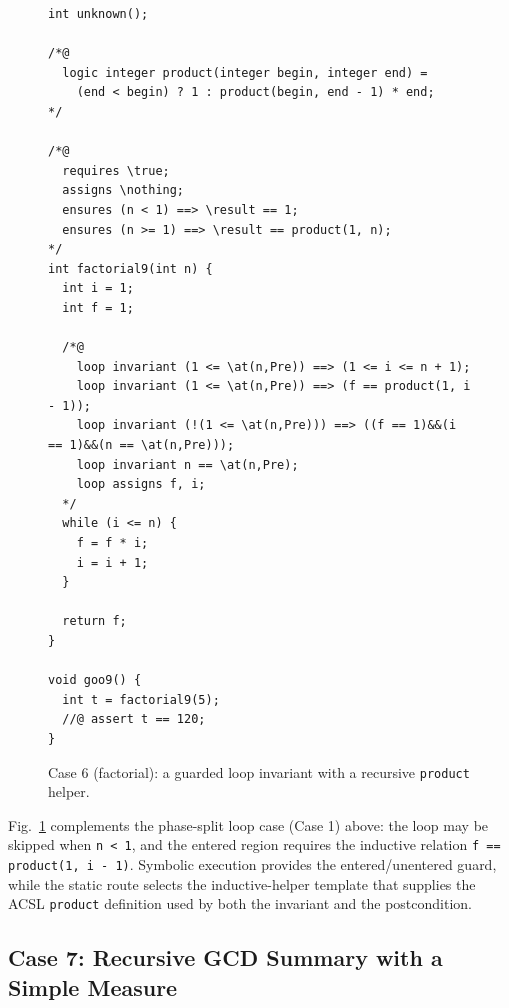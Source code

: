 \begin{figure}[!b]
    \centering
    \begin{tcolorbox}[casebox, title={Case 6: guarded factorial helper}, width=\linewidth]
\begin{lstlisting}[style=casecompactinnerstyle]
int unknown();

/*@
  logic integer product(integer begin, integer end) =
    (end < begin) ? 1 : product(begin, end - 1) * end;
*/

/*@
  requires \true;
  assigns \nothing;
  ensures (n < 1) ==> \result == 1;
  ensures (n >= 1) ==> \result == product(1, n);
*/
int factorial9(int n) {
  int i = 1;
  int f = 1;

  /*@
    loop invariant (1 <= \at(n,Pre)) ==> (1 <= i <= n + 1);
    loop invariant (1 <= \at(n,Pre)) ==> (f == product(1, i - 1));
    loop invariant (!(1 <= \at(n,Pre))) ==> ((f == 1)&&(i == 1)&&(n == \at(n,Pre)));
    loop invariant n == \at(n,Pre);
    loop assigns f, i;
  */
  while (i <= n) {
    f = f * i;
    i = i + 1;
  }

  return f;
}

void goo9() {
  int t = factorial9(5);
  //@ assert t == 120;
}
\end{lstlisting}
    \end{tcolorbox}
    \caption{Case 6 (factorial): a guarded loop invariant with a recursive \texttt{product} helper.}
    \label{fig:case2}
\end{figure}

Fig.~\ref{fig:case2} complements the phase-split loop case (Case 1) above: the loop may be skipped when \texttt{n < 1}, and the entered region requires the inductive relation \texttt{f == product(1, i - 1)}. Symbolic execution provides the entered/unentered guard, while the static route selects the inductive-helper template that supplies the ACSL \texttt{product} definition used by both the invariant and the postcondition.

\subsection{Case 7: Recursive GCD Summary with a Simple Measure}
\label{app:case-gcd}

